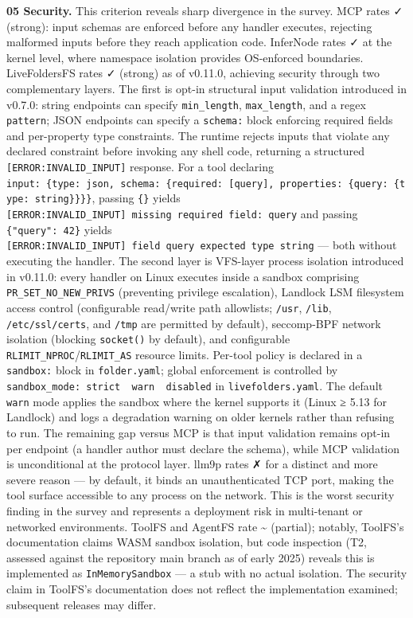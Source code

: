 \documentclass[
  11pt,
]{article}
\begin{document}
\textbf{05 Security.} This criterion reveals sharp divergence in the
survey. MCP rates ✓ (strong): input schemas are enforced before any
handler executes, rejecting malformed inputs before they reach
application code. InferNode rates ✓ at the kernel level, where namespace
isolation provides OS-enforced boundaries. LiveFoldersFS rates ✓
(strong) as of v0.11.0, achieving security through two complementary
layers. The first is opt-in structural input validation introduced in
v0.7.0: string endpoints can specify \texttt{min\_length},
\texttt{max\_length}, and a regex \texttt{pattern}; JSON endpoints can
specify a \texttt{schema:} block enforcing required fields and
per-property type constraints. The runtime rejects inputs that violate
any declared constraint before invoking any shell code, returning a
structured \texttt{{[}ERROR:INVALID\_INPUT{]}} response. For a tool
declaring
\texttt{input:\ \{type:\ json,\ schema:\ \{required:\ {[}query{]},\ properties:\ \{query:\ \{type:\ string\}\}\}\}},
passing \texttt{\{\}} yields
\texttt{{[}ERROR:INVALID\_INPUT{]}\ missing\ required\ field:\ \textquotesingle{}query\textquotesingle{}}
and passing \texttt{\{"query":\ 42\}} yields
\texttt{{[}ERROR:INVALID\_INPUT{]}\ field\ \textquotesingle{}query\textquotesingle{}\ expected\ type\ \textquotesingle{}string\textquotesingle{}}
--- both without executing the handler. The second layer is VFS-layer
process isolation introduced in v0.11.0: every handler on Linux executes
inside a sandbox comprising \texttt{PR\_SET\_NO\_NEW\_PRIVS} (preventing
privilege escalation), Landlock LSM filesystem access control
(configurable read/write path allowlists; \texttt{/usr}, \texttt{/lib},
\texttt{/etc/ssl/certs}, and \texttt{/tmp} are permitted by default),
seccomp-BPF network isolation (blocking \texttt{socket()} by default),
and configurable \texttt{RLIMIT\_NPROC}/\texttt{RLIMIT\_AS} resource
limits. Per-tool policy is declared in a \texttt{sandbox:} block in
\texttt{folder.yaml}; global enforcement is controlled by
\texttt{sandbox\_mode:\ strict\ \textbar{}\ warn\ \textbar{}\ disabled}
in \texttt{livefolders.yaml}. The default \texttt{warn} mode applies the
sandbox where the kernel supports it (Linux ≥ 5.13 for Landlock) and
logs a degradation warning on older kernels rather than refusing to run.
The remaining gap versus MCP is that input validation remains opt-in per
endpoint (a handler author must declare the schema), while MCP
validation is unconditional at the protocol layer. llm9p rates ✗ for a
distinct and more severe reason --- by default, it binds an
unauthenticated TCP port, making the tool surface accessible to any
process on the network. This is the worst security finding in the survey
and represents a deployment risk in multi-tenant or networked
environments. ToolFS and AgentFS rate \textasciitilde{} (partial);
notably, ToolFS's documentation claims WASM sandbox isolation, but code
inspection (T2, assessed against the repository main branch as of early
2025) reveals this is implemented as \texttt{InMemorySandbox} --- a stub
with no actual isolation. The security claim in ToolFS's documentation
does not reflect the implementation examined; subsequent releases may
differ.
\end{document}
